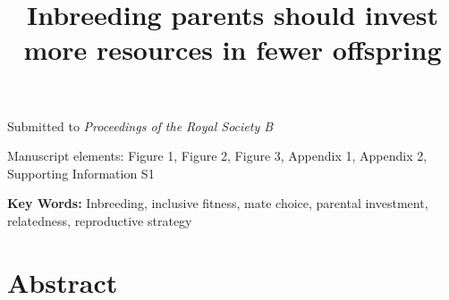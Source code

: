 \documentclass[12pt]{article}
\title{Inbreeding parents should invest more resources in fewer offspring}
\date{}
\begin{document}
\maketitle

\begin{center}
\vspace{5 mm}


\vspace{5 mm}


\vspace{15 mm}

\noindent Submitted to \emph{Proceedings of the Royal Society B}  

\vspace{15 mm} 

\noindent Manuscript elements: Figure 1, Figure 2, Figure 3, Appendix 1, Appendix 2, Supporting Information S1 

\vspace{15 mm}

\noindent \textbf{Key Words:} Inbreeding, inclusive fitness, mate choice, parental investment, relatedness, reproductive strategy
\newline

\end{center}

\linenumbers
\modulolinenumbers[2]
\doublespacing

\clearpage

\section*{Abstract} 
\end{document}
